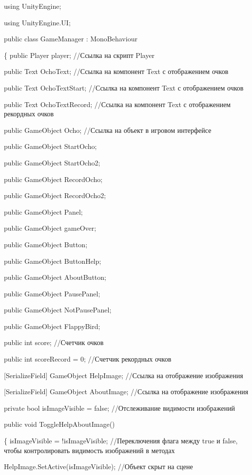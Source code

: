 \documentclass[14pt, oneside]{altsu-report}
\begin{document}
using UnityEngine;

using UnityEngine.UI;

public class GameManager : MonoBehaviour

\{
    public Player player; //Ссылка на скрипт Player

    public Text OchoText; //Ссылка на компонент Text с отображением очков

    public Text OchoTextStart; //Ссылка на компонент Text с отображением очков

    public Text OchoTextRecord; //Ссылка на компонент Text с отображением рекордных очков

    public GameObject Ocho; //Ссылка на объект в игровом интерфейсе 

    public GameObject StartOcho;

    public GameObject StartOcho2;

    public GameObject RecordOcho;

    public GameObject RecordOcho2;

    public GameObject Panel;

    public GameObject gameOver;

    public GameObject Button;

    public GameObject ButtonHelp;

    public GameObject AboutButton;

    public GameObject PausePanel;

    public GameObject NotPausePanel;

    public GameObject FlappyBird;

    public int score; //Счетчик очков

    public int scoreRecord = 0; //Счетчик рекордных очков

    
    [SerializeField] GameObject HelpImage; //Ссылка на отображение изображения
    
    [SerializeField] GameObject AboutImage; //Ссылка на отображение изображения

    private bool isImageVisible = false; //Отслеживание видимости изображений

    public void ToggleHelpAboutImage()
    
    \{
        isImageVisible = !isImageVisible; //Переключения флага между true и false, чтобы контролировать видимость изображений в методах
        
        HelpImage.SetActive(isImageVisible); //Объект скрыт на сцене
        
\end{document}
